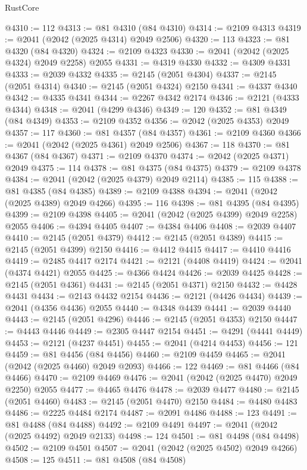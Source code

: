 \begin{lexlean}{RustCore}
\begin{coremodule}
@4310 := 112
@4313 := @81 @4310 (@84 @4310)
@4314 := @2109 @4313
@4319 := @2041 (@2042 (@2025 @4314) @2049 @2506)
@4320 := 113
@4323 := @81 @4320 (@84 @4320)
@4324 := @2109 @4323
@4330 := @2041 (@2042 (@2025 @4324) @2049 @2258) @2055
@4331 := @4319 @4330
@4332 := @4309 @4331
@4333 := @2039 @4332
@4335 := @2145 (@2051 @4304)
@4337 := @2145 (@2051 @4314)
@4340 := @2145 (@2051 @4324) @2150
@4341 := @4337 @4340
@4342 := @4335 @4341
@4344 := @2267 @4342 @2174
@4346 := @2121 (@4333 @4344)
@4348 := @2041 (@4299 @4346)
@4349 := 120
@4352 := @81 @4349 (@84 @4349)
@4353 := @2109 @4352
@4356 := @2042 (@2025 @4353) @2049
@4357 := 117
@4360 := @81 @4357 (@84 @4357)
@4361 := @2109 @4360
@4366 := @2041 (@2042 (@2025 @4361) @2049 @2506)
@4367 := 118
@4370 := @81 @4367 (@84 @4367)
@4371 := @2109 @4370
@4374 := @2042 (@2025 @4371) @2049
@4375 := 114
@4378 := @81 @4375 (@84 @4375)
@4379 := @2109 @4378
@4384 := @2041 (@2042 (@2025 @4379) @2049 @2114)
@4385 := 115
@4388 := @81 @4385 (@84 @4385)
@4389 := @2109 @4388
@4394 := @2041 (@2042 (@2025 @4389) @2049 @4266)
@4395 := 116
@4398 := @81 @4395 (@84 @4395)
@4399 := @2109 @4398
@4405 := @2041 (@2042 (@2025 @4399) @2049 @2258) @2055
@4406 := @4394 @4405
@4407 := @4384 @4406
@4408 := @2039 @4407
@4410 := @2145 (@2051 @4379)
@4412 := @2145 (@2051 @4389)
@4415 := @2145 (@2051 @4399) @2150
@4416 := @4412 @4415
@4417 := @4410 @4416
@4419 := @2485 @4417 @2174
@4421 := @2121 (@4408 @4419)
@4424 := @2041 (@4374 @4421) @2055
@4425 := @4366 @4424
@4426 := @2039 @4425
@4428 := @2145 (@2051 @4361)
@4431 := @2145 (@2051 @4371) @2150
@4432 := @4428 @4431
@4434 := @2143 @4432 @2154
@4436 := @2121 (@4426 @4434)
@4439 := @2041 (@4356 @4436) @2055
@4440 := @4348 @4439
@4441 := @2039 @4440
@4443 := @2145 (@2051 @4296)
@4446 := @2145 (@2051 @4353) @2150
@4447 := @4443 @4446
@4449 := @2305 @4447 @2154
@4451 := @4291 (@4441 @4449)
@4453 := @2121 (@4237 @4451)
@4455 := @2041 (@4214 @4453)
@4456 := 121
@4459 := @81 @4456 (@84 @4456)
@4460 := @2109 @4459
@4465 := @2041 (@2042 (@2025 @4460) @2049 @2093)
@4466 := 122
@4469 := @81 @4466 (@84 @4466)
@4470 := @2109 @4469
@4476 := @2041 (@2042 (@2025 @4470) @2049 @2250) @2055
@4477 := @4465 @4476
@4478 := @2039 @4477
@4480 := @2145 (@2051 @4460)
@4483 := @2145 (@2051 @4470) @2150
@4484 := @4480 @4483
@4486 := @2225 @4484 @2174
@4487 := @2091 @4486
@4488 := 123
@4491 := @81 @4488 (@84 @4488)
@4492 := @2109 @4491
@4497 := @2041 (@2042 (@2025 @4492) @2049 @2133)
@4498 := 124
@4501 := @81 @4498 (@84 @4498)
@4502 := @2109 @4501
@4507 := @2041 (@2042 (@2025 @4502) @2049 @4266)
@4508 := 125
@4511 := @81 @4508 (@84 @4508)

\end{coremodule}
\end{lexlean}
